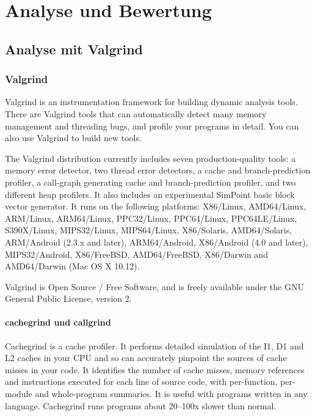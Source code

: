 \chapter{Analyse und Bewertung}



\section{Analyse mit Valgrind}


\subsection{Valgrind}

Valgrind is an instrumentation framework for building dynamic analysis tools. There are Valgrind tools that can automatically detect many memory management and threading bugs, and profile your programs in detail. You can also use Valgrind to build new tools.

The Valgrind distribution currently includes seven production-quality tools: a memory error detector, two thread error detectors, a cache and branch-prediction profiler, a call-graph generating cache and branch-prediction profiler, and two different heap profilers. It also includes an experimental SimPoint basic block vector generator. It runs on the following platforms: X86/Linux, AMD64/Linux, ARM/Linux, ARM64/Linux, PPC32/Linux, PPC64/Linux, PPC64LE/Linux, S390X/Linux, MIPS32/Linux, MIPS64/Linux, X86/Solaris, AMD64/Solaris, ARM/Android (2.3.x and later), ARM64/Android, X86/Android (4.0 and later), MIPS32/Android, X86/FreeBSD, AMD64/FreeBSD, X86/Darwin and AMD64/Darwin (Mac OS X 10.12).

Valgrind is Open Source / Free Software, and is freely available under the GNU General Public License, version 2.


\subsubsection{cachegrind und callgrind}
Cachegrind is a cache profiler. It performs detailed simulation of the I1, D1 and L2 caches in your CPU and so can accurately pinpoint the sources of cache misses in your code. It identifies the number of cache misses, memory references and instructions executed for each line of source code, with per-function, per-module and whole-program summaries. It is useful with programs written in any language. Cachegrind runs programs about 20--100x slower than normal.

